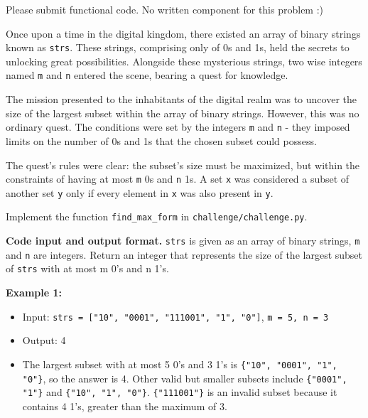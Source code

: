 \documentclass{hw}
\newcommand{\io}{\textbf{Code input and output format.} }
\begin{document}
\begin{solution}
    Please submit functional code. No written component for this problem :)
\end{solution}

\newpage


 \begin{challenge}

Once upon a time in the digital kingdom, there existed an array of binary strings known as \texttt{strs}. These strings, comprising only of 0s and 1s, held the secrets to unlocking great possibilities. Alongside these mysterious strings, two wise integers named \texttt{m} and \texttt{n} entered the scene, bearing a quest for knowledge.

The mission presented to the inhabitants of the digital realm was to uncover the size of the largest subset within the array of binary strings. However, this was no ordinary quest. The conditions were set by the integers \texttt{m} and \texttt{n} - they imposed limits on the number of 0s and 1s that the chosen subset could possess.

The quest's rules were clear: the subset's size must be maximized, but within the constraints of having at most \texttt{m} 0s and \texttt{n} 1s. A set \texttt{x} was considered a subset of another set \texttt{y} only if every element in \texttt{x} was also present in \texttt{y}.


Implement the function \texttt{find\_max\_form} in \texttt{challenge/challenge.py}.

\io \texttt{strs} is given as an array of binary strings, \texttt{m} and \texttt{n} are integers. Return an integer that represents the size of the largest subset of \texttt{strs} with at most m 0's and n 1's. 

\textbf{Example 1:}
\begin{itemize}
    \item Input: \texttt{strs = ["10", "0001", "111001", "1", "0"]}, \texttt{m = 5, n = 3}
    \item Output: 4
    \item The largest subset with at most 5 0's and 3 1's is \texttt{\{"10", "0001", "1", "0"\}}, so the answer is 4. Other valid but smaller subsets include \texttt{\{"0001", "1"\}} and \texttt{\{"10", "1", "0"\}}. \texttt{\{"111001"\}} is an invalid subset because it contains 4 1's, greater than the maximum of 3.
\end{itemize}


\end{challenge}
\end{document}

